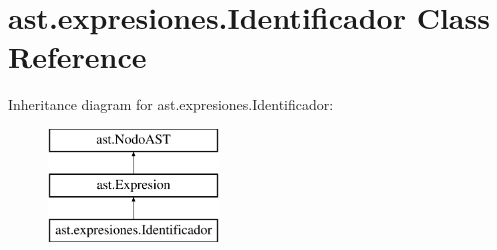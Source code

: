 \hypertarget{classast_1_1expresiones_1_1_identificador}{}\section{ast.\+expresiones.\+Identificador Class Reference}
\label{classast_1_1expresiones_1_1_identificador}
Inheritance diagram for ast.\+expresiones.\+Identificador\+:\begin{figure}[H]
\begin{center}
\leavevmode
\includegraphics[height=3.000000cm]{classast_1_1expresiones_1_1_identificador}
\end{center}
\end{figure}
